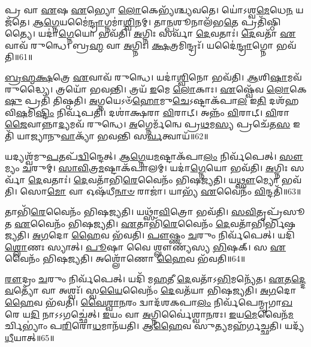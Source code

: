 𑌪𑍍𑌰 𑌵𑌾 \ul{𑌏}\-𑌷 \ul{𑌏}\-𑌭𑍍𑌯𑍋 \ul{𑌲𑍋}\-𑌕𑍇𑌭𑍍𑌯᳴𑌶𑍍𑌚𑍍𑌯𑌵𑌤𑍇।
𑌯𑍋॑𑌽𑌶𑍍𑌵\-\ul{𑌮𑍇}\-𑌧𑍇\-\ul{𑌨} 𑌯𑌜᳴𑌤𑍇।
\-\ul{𑌆}\-\-\ul{𑌗𑍍𑌨𑍇}\-𑌯𑌮𑍈॑\-\ul{𑌨𑍍𑌦𑍍𑌰𑌾}\-𑌗𑍍𑌨𑌮𑌾॑\-\ul{𑌶𑍍𑌵𑌿}\-𑌨𑌮𑍍।
𑌤𑌾\-\ul{𑌨𑍍𑌪}\-𑌶𑍂𑌨𑌾𑌲᳴𑌭\-\ul{𑌤𑍇} 𑌪𑍍𑌰𑌤𑌿᳴\-𑌷𑍍𑌠𑌿𑌤𑍍𑌯𑍈।
𑌯𑌦𑌾॑\-\ul{𑌗𑍍𑌨𑍇}\-𑌯𑍋 𑌭𑌵᳴𑌤𑌿।
\-\ul{𑌅}\-𑌗𑍍𑌨𑌿𑌃 𑌸𑌰𑍍𑌵𑌾᳴ \ul{𑌦𑍇}\-𑌵𑌤𑌾𑌃॑।
\-\ul{𑌦𑍇}\-𑌵𑌤𑌾᳴ \ul{𑌏}\-𑌵𑌾𑌵᳴ 𑌰𑍁𑌨𑍍𑌧𑍇।
𑌬𑍍𑌰\-\ul{𑌹𑍍𑌮} 𑌵𑌾 \ul{𑌅}\-𑌗𑍍𑌨𑌿𑌃।
\-\ul{𑌕𑍍𑌷}\-𑌤𑍍𑌰𑌮𑌿𑌨𑍍𑌦𑍍𑌰𑌃᳴।
𑌯𑌦𑍈॑\-\ul{𑌨𑍍𑌦𑍍𑌰𑌾}\-𑌗𑍍𑌨𑍋 𑌭𑌵᳴𑌤𑌿॥61॥

\-\ul{𑌬𑍍𑌰}\-\-\ul{𑌹𑍍𑌮}\-\-\ul{𑌕𑍍𑌷}\-𑌤𑍍𑌰𑍇 \ul{𑌏}\-𑌵𑌾𑌵᳴ 𑌰𑍁𑌨𑍍𑌧𑍇।
𑌯𑌦𑌾॑\-\ul{𑌶𑍍𑌵𑌿}\-𑌨𑍋 𑌭𑌵᳴𑌤𑌿।
\-\ul{𑌆}\-𑌶𑌿\-\ul{𑌷𑌾}\-𑌮𑌵᳴𑌰𑍁𑌦𑍍𑌧𑍍𑌯𑍈।
𑌤𑍍𑌰𑌯𑍋᳴ 𑌭𑌵𑌨𑍍𑌤𑌿।
𑌤𑍍𑌰𑌯᳴ \ul{𑌇}\-𑌮𑍇 \ul{𑌲𑍋}\-𑌕𑌾𑌃।
\-\ul{𑌏}\-𑌷𑍍𑌵𑍇᳴𑌵 \ul{𑌲𑍋}\-𑌕𑍇\-\ul{𑌷𑍁} 𑌪𑍍𑌰𑌤𑌿᳴ 𑌤𑌿𑌷𑍍𑌠𑌤𑌿।
\-\ul{𑌅}\-𑌗𑍍𑌨𑌯𑍇\-𑌽𑍞᳴\-\ul{𑌹𑍋}\-𑌮𑍁\-\ul{𑌚𑍇}\-\-𑌽𑌷𑍍𑌟𑌾\-𑌕᳴𑌪𑌾\-\ul{𑌲} 𑌇\-\ul{𑌤𑌿} 𑌦𑌶᳴𑌹𑌵𑌿\-\ul{𑌷}\-𑌮𑌿\-\ul{𑌷𑍍𑌟𑌿𑌂} 𑌨𑌿𑌰𑍍𑌵᳴𑌪𑌤𑌿।
𑌦𑌶𑌾॑𑌕𑍍𑌷𑌰𑌾 \ul{𑌵𑌿}\-𑌰𑌾𑌟𑍍।
𑌅𑌨𑍍𑌨𑌂᳴ \ul{𑌵𑌿}\-𑌰𑌾𑌟𑍍।
\-\ul{𑌵𑌿}\-𑌰𑌾\-\ul{𑌜𑍈}\-𑌵𑌾𑌨𑍍𑌨𑌾\-\ul{𑌦𑍍𑌯}\-𑌮𑌵᳴ 𑌰𑍁𑌨𑍍𑌧𑍇।
\-\ul{𑌅}\-𑌗𑍍𑌨𑍇𑌰𑍍𑌮᳴𑌨𑍍𑌵𑍇 𑌪𑍍𑌰\-\ul{𑌥}\-𑌮\-\ul{𑌸𑍍𑌯} 𑌪𑍍𑌰𑌚𑍇᳴𑌤\-\ul{𑌸} 𑌇𑌤𑌿᳴ 𑌯𑌾𑌜𑍍𑌯𑌾𑌨𑍁\-\ul{𑌵𑌾}\-𑌕𑍍𑌯𑌾᳴ 𑌭𑌵𑌨𑍍𑌤𑌿 𑌸\-\ul{𑌰𑍍𑌵}\-𑌤𑍍𑌵𑌾𑌯᳴॥62॥\anuvakamend[𑌅𑌧𑌿᳴𑌪𑌤\-\ul{𑌯} 𑌇𑌤𑍍𑌯𑌾᳴\-\ul{𑌹𑌾}\-𑌭𑌿᳴𑌜𑌿𑌤𑍍𑌯𑌾 𑌐\-\ul{𑌨𑍍𑌦𑍍𑌰𑌾}\-𑌗𑍍𑌨𑍋 𑌭𑌵᳴𑌤𑌿 𑌰𑍁\-\ul{𑌨𑍍𑌧} 𑌏𑌕𑌂᳴ 𑌚]

𑌯𑌦𑍍𑌯𑌶𑍍𑌵᳴𑌮𑍁\-\ul{𑌪}\-𑌤𑌪᳴\-\ul{𑌦𑍍𑌵𑌿}\-𑌨𑍍𑌦𑍇𑌤𑍍।
\-\ul{𑌆}\-\-\ul{𑌗𑍍𑌨𑍇}\-𑌯\-\ul{𑌮}\-𑌷𑍍𑌟𑌾\-𑌕᳴𑌪𑌾\-\ul{𑌲𑌂} 𑌨𑌿𑌰𑍍𑌵᳴𑌪𑍇𑌤𑍍।
\-\ul{𑌸𑍗}\-𑌮𑍍𑌯𑌂 \ul{𑌚}\-𑌰𑍁𑌮𑍍।
\-\ul{𑌸𑌾}\-\-\ul{𑌵𑌿}\-𑌤𑍍𑌰\-\ul{𑌮}\-𑌷𑍍𑌟𑌾\-𑌕᳴𑌪𑌾𑌲𑌮𑍍।
𑌯𑌦𑌾॑\-\ul{𑌗𑍍𑌨𑍇}\-𑌯𑍋 𑌭𑌵᳴𑌤𑌿।
\-\ul{𑌅}\-𑌗𑍍𑌨𑌿𑌃 𑌸𑌰𑍍𑌵𑌾᳴ \ul{𑌦𑍇}\-𑌵𑌤𑌾𑌃॑।
\-\ul{𑌦𑍇}\-𑌵𑌤𑌾᳴𑌭𑌿\-\ul{𑌰𑍇}\-𑌵𑍈𑌨𑌂᳴ 𑌭𑌿𑌷𑌜𑍍𑌯𑌤𑌿।
𑌯\-\ul{𑌥𑍍𑌸𑍗}\-𑌮𑍍𑌯𑍋 𑌭𑌵᳴𑌤𑌿।
𑌸𑍋\-\ul{𑌮𑍋} 𑌵𑌾 𑌓𑌷᳴𑌧𑍀\-\ul{𑌨𑌾}\-\-\ul{𑍞} 𑌰𑌾𑌜𑌾॑।
𑌯𑌾𑌭𑍍𑌯᳴ \ul{𑌏}\-𑌵𑍈𑌨𑌂᳴ \ul{𑌵𑌿}\-𑌨𑍍𑌦𑌤𑌿᳴॥63॥

𑌤𑌾𑌭𑌿᳴\-\ul{𑌰𑍇}\-𑌵𑍈𑌨𑌂᳴ 𑌭𑌿𑌷𑌜𑍍𑌯𑌤𑌿।
𑌯𑌥𑍍𑌸𑌾᳴\-\ul{𑌵𑌿}\-𑌤𑍍𑌰𑍋 𑌭𑌵᳴𑌤𑌿।
\-\ul{𑌸}\-\-\ul{𑌵𑌿}\-𑌤𑍃𑌪𑍍𑌰᳴𑌸𑍂𑌤 \ul{𑌏}\-𑌵𑍈𑌨𑌂᳴ 𑌭𑌿𑌷𑌜𑍍𑌯𑌤𑌿।
\-\ul{𑌏}\-𑌤𑌾𑌭𑌿᳴\-\ul{𑌰𑍇}\-𑌵𑍈𑌨𑌂᳴ \ul{𑌦𑍇}\-𑌵𑌤𑌾᳴𑌭𑌿𑌰𑍍𑌭𑌿𑌷𑌜𑍍𑌯𑌤𑌿।
\-\ul{𑌅}\-\-\ul{𑌗}\-𑌦𑍋 \ul{𑌹𑍈}\-𑌵 𑌭᳴𑌵𑌤𑌿।
\-\ul{𑌪𑍗}\-𑌷𑍍𑌣𑌂 \ul{𑌚}\-𑌰𑍁𑌂 𑌨𑌿𑌰𑍍𑌵᳴𑌪𑍇𑌤𑍍।
𑌯𑌦𑌿᳴ \ul{𑌶𑍍𑌲𑍋}\-𑌣𑌃 𑌸𑍍𑌯𑌾𑌤𑍍।
\-\ul{𑌪𑍂}\-𑌷𑌾 𑌵𑍈 𑌶𑍍𑌲𑍗𑌣𑍍𑌯᳴𑌸𑍍𑌯 \ul{𑌭𑌿}\-𑌷𑌕𑍍।
𑌸 \ul{𑌏}\-𑌵𑍈𑌨𑌂᳴ 𑌭𑌿𑌷𑌜𑍍𑌯𑌤𑌿।
𑌅𑌶𑍍𑌲𑍋᳴𑌣𑍋 \ul{𑌹𑍈}\-𑌵 𑌭᳴𑌵𑌤𑌿॥64॥

\-\ul{𑌰𑍗}\-𑌦𑍍𑌰𑌂 \ul{𑌚}\-𑌰𑍁𑌂 𑌨𑌿𑌰𑍍𑌵᳴𑌪𑍇𑌤𑍍।
𑌯𑌦𑌿᳴ 𑌮\-\ul{𑌹}\-𑌤𑍀 \ul{𑌦𑍇}\-𑌵𑌤𑌾᳴\-𑌽\-\ul{𑌭𑌿}\-𑌮𑌨𑍍𑌯𑍇᳴𑌤।
\-\ul{𑌏}\-\-\ul{𑌤}\-\-\ul{𑌦𑍍𑌦𑍇}\-\-\ul{𑌵}\-𑌤𑍍𑌯𑍋᳴ 𑌵𑌾 𑌅𑌶𑍍𑌵𑌃᳴।
𑌸𑍍𑌵\-\ul{𑌯𑍈}\-𑌵𑍈𑌨𑌂᳴ \ul{𑌦𑍇}\-𑌵𑌤᳴𑌯𑌾 𑌭𑌿𑌷𑌜𑍍𑌯𑌤𑌿।
\-\ul{𑌅}\-\-\ul{𑌗}\-𑌦𑍋 \ul{𑌹𑍈}\-𑌵 𑌭᳴𑌵𑌤𑌿।
\-\ul{𑌵𑍈}\-\-\ul{𑌶𑍍𑌵𑌾}\-\-\ul{𑌨}\-𑌰𑌂 𑌦𑍍𑌵𑌾𑌦᳴𑌶𑌕𑌪𑌾\-\ul{𑌲𑌂} 𑌨𑌿𑌰𑍍𑌵᳴𑌪𑍇𑌨𑍍𑌮𑍃𑌗𑌾\-\ul{𑌖}\-𑌰𑍇 𑌯\-\ul{𑌦𑌿} 𑌨𑌾𑌽𑌽𑌗𑌚𑍍𑌛𑍇॑𑌤𑍍।
\-\ul{𑌇}\-𑌯𑌂 𑌵𑌾 \ul{𑌅}\-𑌗𑍍𑌨𑌿𑌰𑍍𑌵𑍈॑𑌶𑍍𑌵𑌾\-\ul{𑌨}\-𑌰𑌃।
\-\ul{𑌇}\-𑌯\-\ul{𑌮𑍇}\-𑌵𑍈𑌨᳴\-\ul{𑌮}\-𑌰𑍍𑌚𑌿𑌭𑍍𑌯𑌾𑌂॑ 𑌪\-\ul{𑌰𑌿}\-𑌰𑍋\-\ul{𑌧}\-𑌮𑌾𑌨᳴𑌯𑌤𑌿।
𑌆\-\ul{𑌹𑍈}\-𑌵 𑌸𑍁\-\ul{𑌤𑍍𑌯}\-𑌮𑌹᳴𑌰𑍍𑌗𑌚𑍍𑌛𑌤𑌿।
𑌯𑌦𑍍𑌯᳴\-\ul{𑌧𑍀}\-𑌯𑌾𑌤𑍍॥65॥

